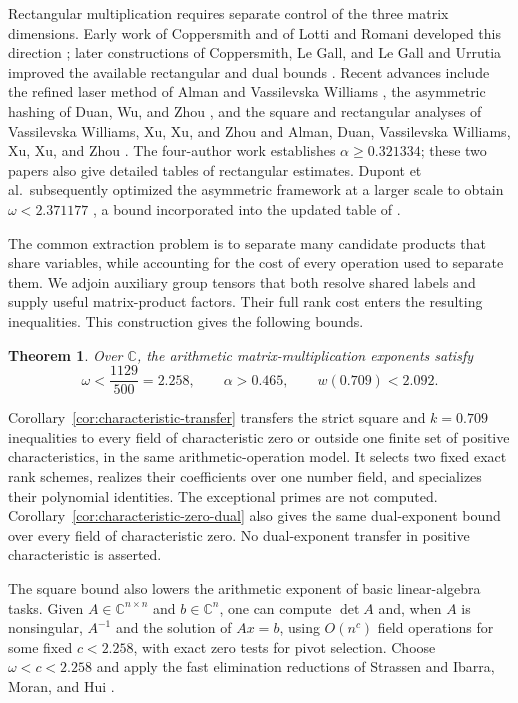 \documentclass[11pt]{article}
\numberwithin{equation}{section}
\newtheorem{theorem}{Theorem}[section]
\theoremstyle{definition}
\theoremstyle{remark}
\newcommand{\C}{\mathbb C}
\begin{document}
Rectangular multiplication requires separate control of the three
matrix dimensions.  Early work of Coppersmith and of Lotti and Romani
developed this direction \cite{coppersmith1982,lottiromani1983}; later
constructions of Coppersmith, Le Gall, and Le Gall and Urrutia improved
the available rectangular and dual bounds
\cite{coppersmith-rect,legall-rect,legall-urrutia}.
Recent advances include the refined laser method of Alman and
Vassilevska Williams \cite{alman-williams}, the asymmetric hashing of
Duan, Wu, and Zhou \cite{duan-wu-zhou}, and the square and rectangular
analyses of Vassilevska Williams, Xu, Xu, and Zhou \cite{vxxz} and
Alman, Duan, Vassilevska Williams, Xu, Xu, and Zhou \cite{advxxz}.
The four-author work establishes \(\alpha\ge0.321334\); these two
papers also give detailed tables of rectangular estimates.
Dupont et al.\ subsequently optimized the asymmetric framework at
a larger scale to obtain \(\omega<2.371177\)
\cite{dupont}, a bound incorporated into the updated table of
\cite{advxxz}.

The common extraction problem is to separate many candidate products
that share variables, while accounting for the cost of every operation
used to separate them.  We adjoin auxiliary group tensors that both
resolve shared labels and supply useful matrix-product factors.  Their
full rank cost enters the resulting inequalities.  This construction
gives the following bounds.

\begin{theorem}\label{thm:main}\label{thm:square}\label{thm:rectangular}
Over \(\C\), the arithmetic matrix-multiplication exponents satisfy
\[
 \omega<\frac{1129}{500}=2.258,\qquad
 \alpha>0.465,\qquad w(0.709)<2.092.
\]
\end{theorem}

Corollary~\ref{cor:characteristic-transfer} transfers the strict square
and \(k=0.709\) inequalities to every field of characteristic zero or
outside one finite set of positive characteristics, in the same
arithmetic-operation model.  It selects two fixed exact rank schemes,
realizes their coefficients over one number field, and specializes
their polynomial identities.  The exceptional primes are not computed.
Corollary~\ref{cor:characteristic-zero-dual} also gives the same
dual-exponent bound over every field of characteristic zero.
No dual-exponent transfer in positive characteristic is asserted.

The square bound also lowers the arithmetic exponent of basic
linear-algebra tasks.  Given \(A\in\C^{n\times n}\) and
\(b\in\C^n\), one can compute \(\det A\) and, when \(A\) is
nonsingular, \(A^{-1}\) and the solution of \(Ax=b\), using
\(O(n^c)\) field operations for some fixed \(c<2.258\), with exact
zero tests for pivot selection.  Choose \(\omega<c<2.258\) and apply
the fast elimination reductions of Strassen \cite{strassen} and
Ibarra, Moran, and Hui
\cite[Theorem~2.1 and Corollary~2.1]{ibarra-moran-hui}.
\end{document}
